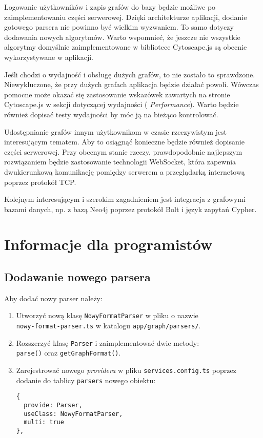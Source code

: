 Logowanie użytkowników i zapis grafów do bazy będzie możliwe po zaimplementowaniu części serwerowej. Dzięki architekturze aplikacji, dodanie gotowego parsera nie powinno być wielkim wyzwaniem. To samo dotyczy dodawania nowych algorytmów. Warto wspomnieć, że jeszcze nie wszystkie algorytmy domyślnie zaimplementowane w bibliotece Cytoscape.js są obecnie wykorzystywane w aplikacji.

Jeśli chodzi o wydajność i obsługę dużych grafów, to nie zostało to sprawdzone. Niewykluczone, że przy dużych grafach aplikacja będzie działać powoli. Wówczas pomocne może okazać się zastosowanie wskazówek zawartych na stronie Cytoscape.js w sekcji dotyczącej wydajności (\cite{cytoscape} \textit{Performance}). Warto będzie również dopisać testy wydajności by móc ją na bieżąco kontrolować. 

Udostępnianie grafów innym użytkownikom w czasie rzeczywistym jest interesującym tematem. Aby to osiągnąć konieczne będzie również dopisanie części serwerowej. Przy obecnym stanie rzeczy, prawdopodobnie najlepszym rozwiązaniem będzie zastosowanie technologii WebSocket, która zapewnia dwukierunkową komunikację pomiędzy serwerem a przeglądarką internetową poprzez protokół TCP. 

Kolejnym interesującym i szerokim zagadnieniem jest integracja z grafowymi bazami danych, np. z bazą Neo4j poprzez protokół Bolt i język zapytań Cypher.

\section{Informacje dla programistów}

\subsection*{Dodawanie nowego parsera}

Aby dodać nowy parser należy:

\begin{enumerate}
\setlength\itemsep{0em}
\item Utworzyć nową klasę \texttt{NowyFormatParser} w pliku o nazwie \\ \texttt{nowy-format-parser.ts} w katalogu \texttt{app/graph/parsers/}.

\item Rozszerzyć klasę \texttt{Parser} i zaimplementować dwie metody: \\ \texttt{parse()} oraz \texttt{getGraphFormat()}.

\item Zarejestrować nowego \textit{providera} w pliku \texttt{services.config.ts} poprzez dodanie do tablicy \texttt{parsers} nowego obiektu:
\begin{verbatim}
{
  provide: Parser, 
  useClass: NowyFormatParser, 
  multi: true
},
\end{verbatim}
\end{enumerate}

